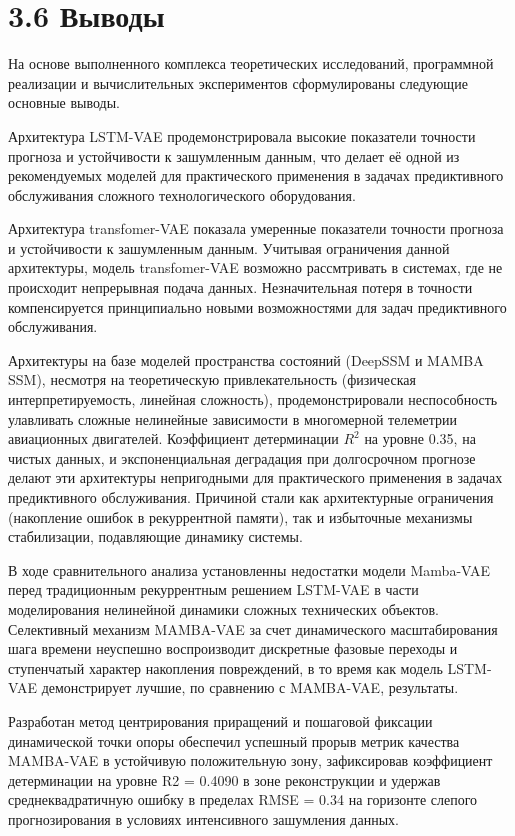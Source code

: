 \documentclass[14pt, a4paper, oneside]{extreport}
\begin{document}
\vspace{1em}
\section{3.6 Выводы}
\vspace{1em}

На основе выполненного комплекса теоретических исследований, программной реализации и вычислительных экспериментов сформулированы следующие основные выводы.

Архитектура LSTM-VAE продемонстрировала высокие показатели точности прогноза и устойчивости к зашумленным данным, что делает её одной из рекомендуемых моделей для практического применения в задачах предиктивного обслуживания сложного технологического оборудования.
    
Архитектура transfomer-VAE показала умеренные показатели точности прогноза и устойчивости к зашумленным данным. Учитывая ограничения данной архитектуры, модель transfomer-VAE возможно рассмтривать в системах, где не происходит непрерывная подача данных. Незначительная потеря в точности компенсируется принципиально новыми возможностями для задач предиктивного обслуживания.
    
Архитектуры на базе моделей пространства состояний (DeepSSM и MAMBA SSM), несмотря на теоретическую привлекательность (физическая интерпретируемость, линейная сложность), продемонстрировали неспособность улавливать сложные нелинейные зависимости в многомерной телеметрии авиационных двигателей. Коэффициент детерминации $R^2$ на уровне 0.35, на чистых данных, и экспоненциальная деградация при долгосрочном прогнозе делают эти архитектуры непригодными для практического применения в задачах предиктивного обслуживания. Причиной стали как архитектурные ограничения (накопление ошибок в рекуррентной памяти), так и избыточные механизмы стабилизации, подавляющие динамику системы.

В ходе сравнительного анализа установленны недостатки модели Mamba-VAE перед традиционным рекуррентным решением LSTM-VAE в части моделирования нелинейной динамики сложных технических объектов. Селективный механизм MAMBA-VAE за счет динамического масштабирования шага времени неуспешно воспроизводит дискретные фазовые переходы и ступенчатый характер накопления повреждений, в то время как модель LSTM-VAE демонстрирует лучшие, по сравнению с MAMBA-VAE, результаты.

Разработан метод центрирования приращений и пошаговой фиксации динамической точки опоры обеспечил успешный прорыв метрик качества MAMBA-VAE в устойчивую положительную зону, зафиксировав коэффициент детерминации на уровне R2 = 0.4090 в зоне реконструкции и удержав среднеквадратичную ошибку в пределах RMSE = 0.34 на горизонте слепого прогнозирования в условиях интенсивного зашумления данных.
\end{document}
